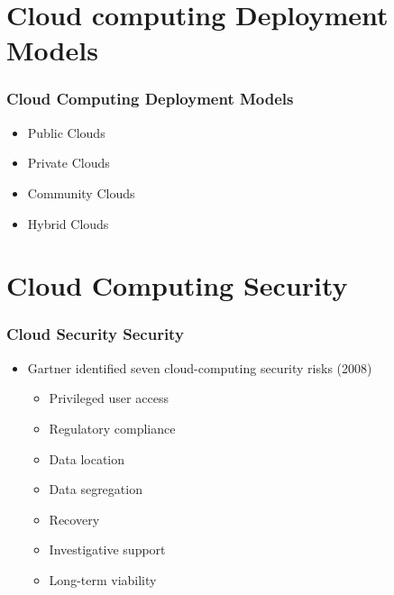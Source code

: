 \documentclass{beamer}
\begin{document}
\section{Cloud computing Deployment Models}

\begin{frame}
\frametitle{Cloud Computing Deployment Models}
\begin{itemize}
  \item Public Clouds
  \item Private Clouds
  \item Community Clouds
  \item Hybrid Clouds
\end{itemize}
\end{frame}

\section{Cloud Computing Security}

\begin{frame}
\frametitle{Cloud Security Security}
\begin{itemize}
  \item Gartner identified seven cloud-computing security risks (2008)
    \begin{itemize}
    \item Privileged user access
    \item Regulatory compliance
    \item Data location
    \item Data segregation
    \item Recovery
    \item Investigative support
    \item Long-term viability
    \end{itemize}
\end{itemize}
\end{frame}

\end{document}
